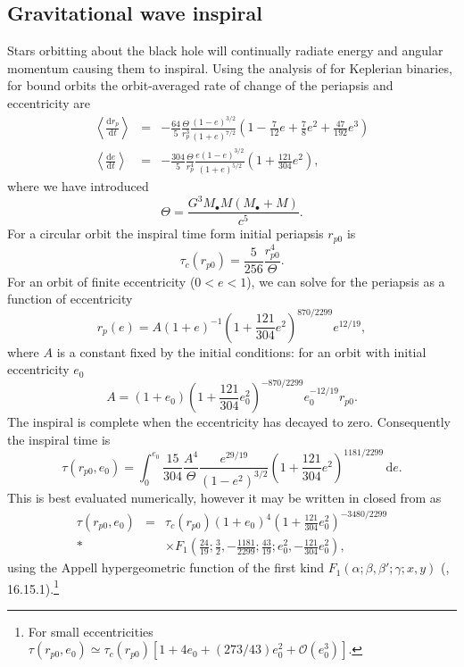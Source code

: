 \documentclass[useAMS,usedcolumn,usegraphicx,usenatbib]{mn2e}
\newcommand{\dd}{\ensuremath{\mathrm{d}}}
\newcommand{\diff}[2]{\ensuremath{\frac{\dd {#1}}{\dd {#2}}}}
\newcommand{\intd}[4]{\ensuremath{\int_{#1}^{#2}{#3}\,\dd{#4}}}
\newcommand{\order}[1]{\ensuremath{\mathcal{O}({#1})}}
\begin{document}
\subsection{Gravitational wave inspiral}

Stars orbitting about the black hole will continually radiate energy and angular momentum causing them to inspiral. Using the analysis of \citet{Peters1964} for Keplerian binaries, for bound orbits the orbit-averaged rate of change of the periapsis and eccentricity are
\begin{eqnarray}
\left\langle\diff{r_p}{t}\right\rangle & = & -\frac{64}{5}\frac{\Theta}{r_p^3}\frac{(1 - e)^{3/2}}{(1 + e)^{7/2}}\left(1 - \frac{7}{12}e + \frac{7}{8}e^2 + \frac{47}{192}e^3\right) \\
\left\langle\diff{e}{t}\right\rangle & = & -\frac{304}{5}\frac{\Theta}{r_p^4}\frac{e(1 - e)^{3/2}}{(1 + e)^{5/2}}\left(1 + \frac{121}{304}e^2\right),
\end{eqnarray}
where we have introduced
\begin{equation}
\Theta = \frac{G^3M_\bullet M(M_\bullet + M)}{c^5}.
\end{equation}
For a circular orbit the inspiral time form initial periapsis $r_{p0}$ is
\begin{equation}
\tau_c(r_{p0}) = \frac{5}{256}\frac{r_{p0}^4}{\Theta}.
\end{equation}
For an orbit of finite eccentricity ($0 < e < 1$), we can solve for the periapsis as a function of eccentricity
\begin{equation}
r_p(e) = A(1 + e)^{-1}\left(1 + \frac{121}{304}e^2\right)^{870/2299}e^{12/19},
\end{equation}
where $A$ is a constant fixed by the initial conditions: for an orbit with initial eccentricity $e_0$
\begin{equation}
A = (1 + e_0)\left(1 + \frac{121}{304}e_0^2\right)^{-870/2299}e_0^{-12/19}r_{p0}.
\end{equation}
The inspiral is complete when the eccentricity has decayed to zero. Consequently the inspiral time is~\citep{Peters1964}
\begin{equation}
\tau(r_{p0},e_0) = \intd{0}{e_0}{\frac{15}{304}\frac{A^4}{\Theta}\frac{e^{29/19}}{(1-e^2)^{3/2}}\left(1 + \frac{121}{304}e^2\right)^{1181/2299}}{e}.
\end{equation}
This is best evaluated numerically, however it may be written in closed from as
\begin{eqnarray}
\tau(r_{p0},e_0) & = & \tau_c(r_{p0})(1 + e_0)^4\left(1 + \frac{121}{304}e_0^2\right)^{-3480/2299} \nonumber\\*
 & & \times F_1\left(\frac{24}{19};\frac{3}{2},-\frac{1181}{2299};\frac{43}{19};e_0^2,-\frac{121}{304}e_0^2\right),
\end{eqnarray}
using the Appell hypergeometric function of the first kind $F_1(\alpha;\beta,\beta';\gamma;x,y)$ (\citealt{Olver2010}, 16.15.1).\footnote{For small eccentricities $\tau(r_{p0},e_0) \simeq \tau_c(r_{p0})[1 + 4e_0 + (273/43)e_0^2 + \order{e_0^3}]$.}
\end{document}
